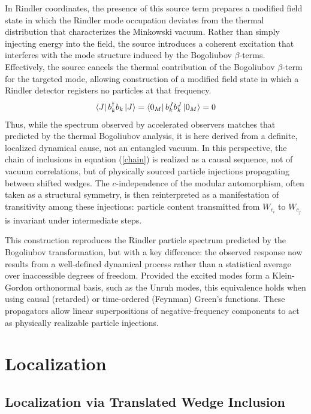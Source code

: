 \documentclass[12pt,a4paper]{article}
\begin{document}
In Rindler coordinates, the presence of this source term prepares a modified field state in which the Rindler mode occupation deviates from the thermal distribution that characterizes the Minkowski vacuum. Rather than simply injecting energy into the field, the source introduces a coherent excitation that interferes with the mode structure induced by the Bogoliubov $\beta$-terms. Effectively, the source cancels the thermal contribution of the Bogoliubov $\beta$-term for the targeted mode, allowing construction of a modified field state in which a Rindler detector registers no particles at that frequency.
\begin{equation}
  \bra{J}  b_k^{\dagger} b_k \ket{J} = \bra{0_M}  b_k^{J} b^{J}_k \ket{0_M} = 0
\end{equation}
Thus, while the spectrum observed by accelerated observers matches that predicted by the thermal Bogoliubov analysis, it is here derived from a definite, localized dynamical cause, not an entangled vacuum. In this perspective, the chain of inclusions in equation (\ref{chain}) is realized as a causal sequence, not of vacuum correlations, but of physically sourced particle injections propagating between shifted wedges. The $c$-independence of the modular automorphism, often taken as a structural symmetry, is then reinterpreted as a manifestation of transitivity among these injections: particle content transmitted from $W_{c_i}$ to $W_{c_j}$ is invariant under intermediate steps.


This construction reproduces the Rindler particle spectrum predicted by the Bogoliubov transformation, but with a key difference: the observed response now results from a well-defined dynamical process rather than a statistical average over inaccessible degrees of freedom. Provided the excited modes form a Klein-Gordon orthonormal basis, such as the Unruh modes, this equivalence holds when using causal (retarded) or time-ordered (Feynman) Green’s functions. These propagators allow linear superpositions of negative-frequency components to act as physically realizable particle injections.

\section{Localization}
\subsection{Localization via Translated Wedge Inclusion}
\end{document}
